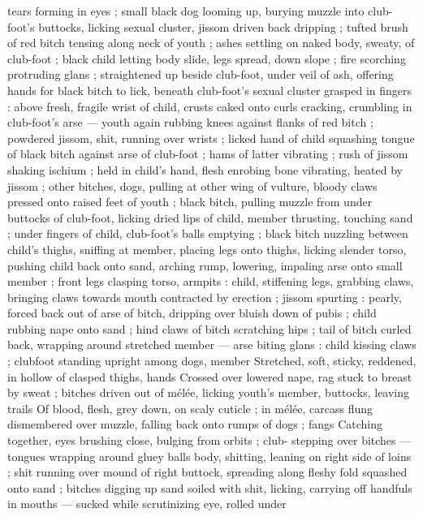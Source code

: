tears forming in eyes ; small black dog looming up, burying muzzle
into club-foot's buttocks, licking sexual cluster, jissom driven back
dripping ; tufted brush of red bitch tensing along neck of youth ;
ashes settling on naked body, sweaty, of club-foot ; black child
letting body slide, legs spread, down slope ; fire scorching
protruding glans ; straightened up beside club-foot, under veil of
ash, offering hands for black bitch to lick, beneath club-foot's sexual
cluster grasped in fingers : above fresh, fragile wrist of child, crusts
caked onto curls cracking, crumbling in club-foot's arse --- youth
again rubbing knees against flanks of red bitch ; powdered jissom,
shit, running over wrists ; licked hand of child squashing tongue of
black bitch against arse of club-foot ; hams of latter vibrating ; rush
of jissom shaking ischium ; held in child's hand, flesh enrobing bone
vibrating, heated by jissom ; other bitches, dogs, pulling at other
wing of vulture, bloody claws pressed onto raised feet of youth ;
black bitch, pulling muzzle from under buttocks of club-foot, licking
dried lips of child, member thrusting, touching sand ; under fingers
of child, club-foot's balls emptying ; black bitch nuzzling between
child's thighs, sniffing at member, placing legs onto thighs, licking
slender torso, pushing child back onto sand, arching rump, lowering,
impaling arse onto small member ; front legs clasping torso, armpits
: child, stiffening legs, grabbing claws, bringing claws towards mouth
contracted by erection ; jissom spurting : pearly, forced back out of
arse of bitch, dripping over bluish down of pubis ; child rubbing
nape onto sand ; hind claws of bitch scratching hips ; tail of bitch
curled back, wrapping around stretched member --- arse biting glans
: child kissing claws ; clubfoot standing upright among dogs, member
Stretched, soft, sticky, reddened, in hollow of clasped thighs, hands
Crossed over lowered nape, rag stuck to breast by sweat ; bitches
driven out of mélée, licking youth's member, buttocks, leaving trails
Of blood, flesh, grey down, on scaly cuticle ; in mélée, carcass flung
dismembered over muzzle, falling back onto rumps of dogs ; fangs
Catching together, eyes brushing close, bulging from orbits ; club-
stepping over bitches --- tongues wrapping around gluey balls
body, shitting, leaning on right side of loins ; shit running over
mound of right buttock, spreading along fleshy fold squashed onto
sand ; bitches digging up sand soiled with shit, licking, carrying off
handfuls in mouths --- sucked while scrutinizing eye, rolled under
